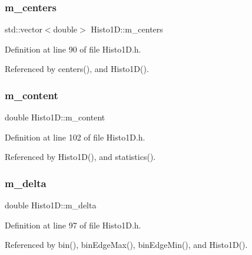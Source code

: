 \subsubsection{\texorpdfstring{m\+\_\+centers}{m\_centers}}
{\footnotesize\ttfamily std\+::vector$<$double$>$ Histo1\+D\+::m\+\_\+centers\hspace{0.3cm}{\ttfamily [private]}}



Definition at line 90 of file Histo1\+D.\+h.



Referenced by centers(), and Histo1\+D().

\mbox{\label{classHisto1D_a75f4abeae577e232f4c012cb6b4049d7}} 
\subsubsection{\texorpdfstring{m\+\_\+content}{m\_content}}
{\footnotesize\ttfamily double Histo1\+D\+::m\+\_\+content\hspace{0.3cm}{\ttfamily [private]}}



Definition at line 102 of file Histo1\+D.\+h.



Referenced by Histo1\+D(), and statistics().

\mbox{\label{classHisto1D_a993e2e40b89e257e6f86c0742f6f06b3}} 
\subsubsection{\texorpdfstring{m\+\_\+delta}{m\_delta}}
{\footnotesize\ttfamily double Histo1\+D\+::m\+\_\+delta\hspace{0.3cm}{\ttfamily [private]}}



Definition at line 97 of file Histo1\+D.\+h.



Referenced by bin(), bin\+Edge\+Max(), bin\+Edge\+Min(), and Histo1\+D().

\mbox{\label{classHisto1D_a4188c6d1b4bfc8f9d8bde7616b4dbf5b}} 
